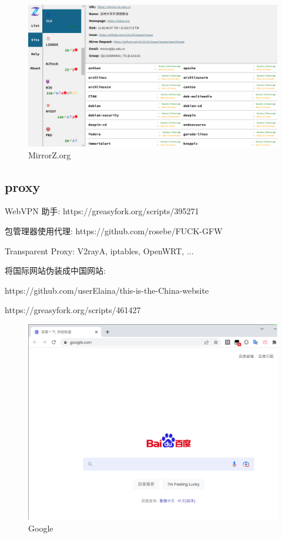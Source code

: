\documentclass[a4paper]{article}
\begin{document}
\begin{figure}[hb]
    \centering
    \includegraphics[height=.4\textheight]{figures/mirrorz.png}
    \caption{MirrorZ.org}
\end{figure}

\subsection{\LARGE proxy}

WebVPN 助手: https://greasyfork.org/scripts/395271

包管理器使用代理: https://github.com/rosebe/FUCK-GFW

Transparent Proxy: V2rayA, iptables, OpenWRT, ...

将国际网站伪装成中国网站:

https://github.com/userElaina/this-is-the-China-website

https://greasyfork.org/scripts/461427

\begin{figure}[hb]
    \centering
    \includegraphics[height=.4\textheight]{figures/google.png}
    \caption{Google}
\end{figure}
\end{document}

